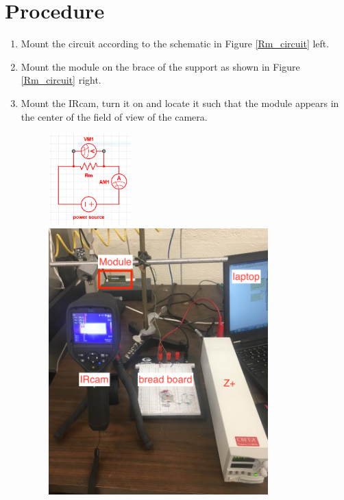 \documentclass[12pt]{unlsilabsop}
\begin{document}
\section{Procedure}
\begin{enumerate}
    \item Mount the circuit according to the schematic in Figure \ref{Rm_circuit} left.
    \item Mount the module on the brace of the support as shown in Figure \ref{Rm_circuit} right.
    \item Mount the IRcam, turn it on and locate it such that the module appears in the center of the field of view of the camera.
        \begin{figure}[h!]
          \begin{center}
          \includegraphics[width=0.3\textwidth]{img/Rm_circuit.png}\\
          \includegraphics[width=0.8\textwidth]{img/setup.png}

\end{center}
\end{figure}
\end{enumerate}
\end{document}
